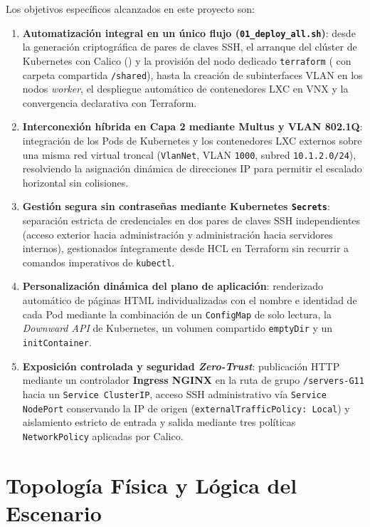 Los objetivos específicos alcanzados en este proyecto son:
\begin{enumerate}
  \item \textbf{Automatización integral en un único flujo (\texttt{01\_deploy\_all.sh})}: desde la generación criptográfica de pares de claves SSH, el arranque del clúster de Kubernetes con Calico () y la provisión del nodo dedicado \texttt{terraform} ( con carpeta compartida \texttt{/shared}), hasta la creación de subinterfaces VLAN en los nodos \textit{worker}, el despliegue automático de contenedores LXC en VNX y la convergencia declarativa con Terraform.
  \item \textbf{Interconexión híbrida en Capa 2 mediante Multus y VLAN 802.1Q}: integración de los Pods de Kubernetes y los contenedores LXC externos sobre una misma red virtual troncal (\texttt{VlanNet}, VLAN \texttt{1000}, subred \texttt{10.1.2.0/24}), resolviendo la asignación dinámica de direcciones IP para permitir el escalado horizontal sin colisiones.
  \item \textbf{Gestión segura sin contraseñas mediante Kubernetes \texttt{Secrets}}: separación estricta de credenciales en dos pares de claves SSH independientes (acceso exterior hacia administración y administración hacia servidores internos), gestionados íntegramente desde HCL en Terraform sin recurrir a comandos imperativos de \texttt{kubectl}.
  \item \textbf{Personalización dinámica del plano de aplicación}: renderizado automático de páginas HTML individualizadas con el nombre e identidad de cada Pod mediante la combinación de un \texttt{ConfigMap} de solo lectura, la \textit{Downward API} de Kubernetes, un volumen compartido \texttt{emptyDir} y un \texttt{initContainer}.
  \item \textbf{Exposición controlada y seguridad \textit{Zero-Trust}}: publicación HTTP mediante un controlador \textbf{Ingress NGINX} en la ruta de grupo \texttt{/servers-G11} hacia un \texttt{Service ClusterIP}, acceso SSH administrativo vía \texttt{Service NodePort} conservando la IP de origen (\texttt{externalTrafficPolicy: Local}) y aislamiento estricto de entrada y salida mediante tres políticas \texttt{NetworkPolicy} aplicadas por Calico.
\end{enumerate}

\section{Topología Física y Lógica del Escenario}

